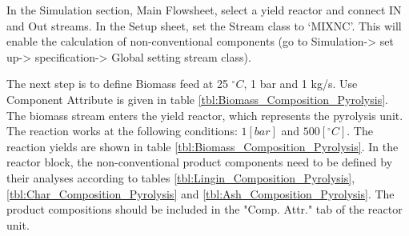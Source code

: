 In the Simulation section, Main Flowsheet, select a yield reactor and connect IN and Out streams. In the Setup sheet, set the Stream class to ‘MIXNC’. This will enable the calculation of non-conventional components (go to Simulation-> set up-> specification-> Global setting stream class). 

The next step is to define Biomass feed at 25 $^\circ C$, 1 bar and 1 kg/s. Use Component Attribute is given in table \ref{tbl:Biomass_Composition_Pyrolysis}. The biomass stream enters the yield reactor, which represents the pyrolysis unit. The reaction works at the following conditions: $1 [bar]$ and $500 [^\circ C]$. The reaction yields are shown in table \ref{tbl:Biomass_Composition_Pyrolysis}. In the reactor block, the non-conventional product components need to be defined by their analyses according to tables \ref{tbl:Lingin_Composition_Pyrolysis}, \ref{tbl:Char_Composition_Pyrolysis} and \ref{tbl:Ash_Composition_Pyrolysis}. The product compositions should be included in the "Comp. Attr." tab of the reactor unit.

